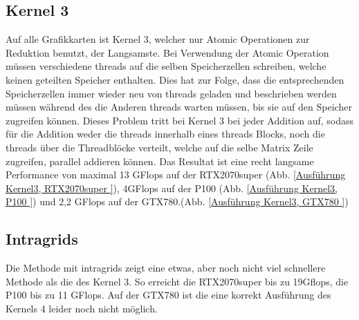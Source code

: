 \documentclass[10pt,a4paper]{article}
\begin{document}
	 \subsection{Kernel 3}
	 Auf alle Grafikkarten ist Kernel 3, welcher nur Atomic Operationen zur Reduktion benutzt, der Langsamste. Bei Verwendung der Atomic Operation müssen verschiedene threads auf die selben Speicherzellen schreiben, welche keinen geteilten Speicher enthalten. Dies hat zur Folge, dass die entsprechenden Speicherzellen immer wieder neu von threads geladen und beschrieben werden müssen während des die Anderen threads warten müssen, bis sie auf den Speicher zugreifen können. Dieses Problem tritt bei Kernel 3 bei jeder Addition auf, sodass für die Addition weder die threads innerhalb eines threads Blocks, noch die threads über die Threadblöcke verteilt, welche auf die selbe Matrix Zeile zugreifen, parallel addieren können. Das Resultat ist eine recht langsame Performance von maximal 13 GFlops auf der RTX2070super (Abb. \ref{Ausführung Kernel3, RTX2070super }), 4GFlops auf der P100 (Abb. \ref{Ausführung Kernel3, P100 }) und 2,2 GFlops auf der GTX780.(Abb. \ref{Ausführung Kernel3, GTX780 })\\
	 \subsection{Intragrids}
	 Die Methode mit intragrids zeigt eine etwas, aber noch nicht viel schnellere Methode als die des Kernel 3. So erreicht die RTX2070super bis zu 19Gflops, die P100 bis zu 11 GFlops. Auf der GTX780 ist die eine korrekt Ausführung des Kernels 4 leider noch nicht möglich.\\
\end{document}
